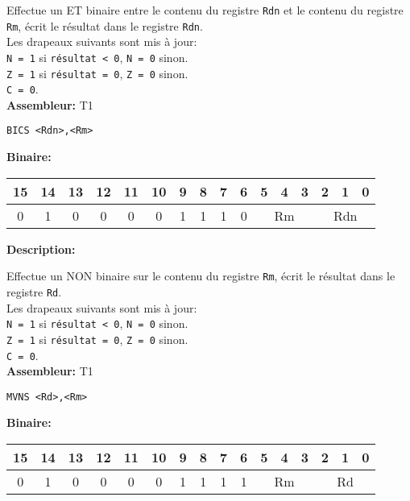 Effectue un ET binaire entre le contenu du registre \texttt{Rdn} et le contenu du registre \texttt{Rm}, écrit le résultat dans le registre \texttt{Rdn}.\\
Les drapeaux suivants sont mis à jour:\\
\texttt{N = 1} si \texttt{résultat < 0}, \texttt{N = 0} sinon.\\
\texttt{Z = 1} si \texttt{résultat = 0}, \texttt{Z = 0} sinon.\\
\texttt{C = 0}.\\

\textbf{Assembleur:} T1

\begin{lstlisting}
BICS <Rdn>,<Rm>
\end{lstlisting}

\textbf{Binaire:}\\

\begin{tabular}{| c c c c c c c c c c c c c c c c |}
\hline
15 & 14 & 13 & 12 & 11 & 10 & \multicolumn{1}{|c}{9} & 8 & 7 & 6 & \multicolumn{1}{|c}{5} & 4 & 3 & \multicolumn{1}{|c}{2} & 1 & 0 \\
\hline
0 & 1 & 0 & 0 & 0 & 0 & \multicolumn{1}{|c}{1} & 1 & 1 & 0 & \multicolumn{3}{|c}{Rm} & \multicolumn{3}{|c|}{Rdn} \\
\hline
\end{tabular}



\textbf{Description: }

Effectue un NON binaire sur le contenu du registre \texttt{Rm}, écrit le résultat dans le registre \texttt{Rd}.\\
Les drapeaux suivants sont mis à jour:\\
\texttt{N = 1} si \texttt{résultat < 0}, \texttt{N = 0} sinon.\\
\texttt{Z = 1} si \texttt{résultat = 0}, \texttt{Z = 0} sinon.\\
\texttt{C = 0}.\\

\textbf{Assembleur:} T1

\begin{lstlisting}
MVNS <Rd>,<Rm>
\end{lstlisting}

\textbf{Binaire:}\\

\begin{tabular}{| c c c c c c c c c c c c c c c c |}
\hline
15 & 14 & 13 & 12 & 11 & 10 & \multicolumn{1}{|c}{9} & 8 & 7 & 6 & \multicolumn{1}{|c}{5} & 4 & 3 & \multicolumn{1}{|c}{2} & 1 & 0 \\
\hline
0 & 1 & 0 & 0 & 0 & 0 & \multicolumn{1}{|c}{1} & 1 & 1 & 1 & \multicolumn{3}{|c}{Rm} & \multicolumn{3}{|c|}{Rd} \\
\hline
\end{tabular}


